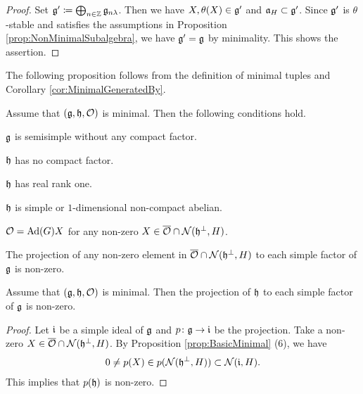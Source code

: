 \begin{proof}
	Set $\mathfrak{g'} \coloneq \bigoplus_{n \in \mathbb{Z}} \mathfrak{g}_{n\lambda}$.
	Then we have $X, \theta(X) \in \mathfrak{g'}$ and $\mathfrak{a}_H \subset \mathfrak{g'}$.
	Since $\mathfrak{g'}$ is $\theta$-stable and satisfies the assumptions in Proposition \ref{prop:NonMinimalSubalgebra}, we have $\mathfrak{g'} =\mathfrak{g}$ by minimality.
	This shows the assertion.
\end{proof}

The following proposition follows from the definition of minimal tuples and Corollary \ref{cor:MinimalGeneratedBy}.

\begin{proposition} \label{prop:BasicMinimal}
	Assume that $(\mathfrak{g}, \mathfrak{h}, \mathcal{O})$ is minimal.
	Then the following conditions hold.
	\begin{enumparen}
		\item $\mathfrak{g}$ is semisimple without any compact factor.
		\item $\mathfrak{h}$ has no compact factor.
		\item $\mathfrak{h}$ has real rank one.
		\item $\mathfrak{h}$ is simple or $1$-dimensional non-compact abelian.
		\item $\mathcal{O} = \mathrm{Ad}(G)X$ for any non-zero $X \in \overline{\mathcal{O}} \cap \mathcal{N}(\mathfrak{h}^\perp, H)$.
		\item The projection of any non-zero element in $\overline{\mathcal{O}} \cap \mathcal{N}(\mathfrak{h}^\perp, H)$ to each simple factor of $\mathfrak{g}$ is non-zero.
	\end{enumparen}
\end{proposition}

\begin{proposition} \label{prop:BasicMinimalH}
	Assume that $(\mathfrak{g}, \mathfrak{h}, \mathcal{O})$ is minimal.
	Then the projection of $\mathfrak{h}$ to each simple factor of $\mathfrak{g}$ is non-zero.
\end{proposition}

\begin{proof}
	Let $\mathfrak{i}$ be a simple ideal of $\mathfrak{g}$ and $p\colon \mathfrak{g} \rightarrow \mathfrak{i}$ be the projection.
	Take a non-zero $X \in \overline{\mathcal{O}} \cap \mathcal{N}(\mathfrak{h}^\perp, H)$.
	By Proposition \ref{prop:BasicMinimal} (6), we have
	\begin{align*}
		0 \neq p(X) \in p(\mathcal{N}(\mathfrak{h}^\perp, H)) \subset \mathcal{N}(\mathfrak{i}, H).
	\end{align*}
	This implies that $p(\mathfrak{h})$ is non-zero.
\end{proof}

